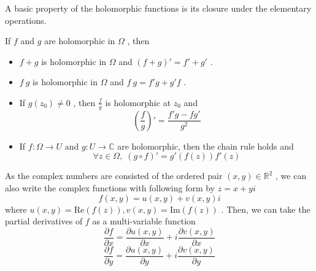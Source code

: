 \documentclass[12pt]{report}
\theoremstyle{mydefstyle}
\newcommand{\RR}{\mathbb{R}}
\newcommand{\CC}{\mathbb{C}}
\newcommand{\RE}{\mathrm{Re}}
\newcommand{\IM}{\mathrm{Im}}
\newcommand{\Par}{\partial}
\begin{document}
A basic property of the holomorphic functions is its closure under the elementary operations.

\begin{proposition}
    If $f$ and $g$ are holomorphic in $\Omega$ , then
    \begin{itemize}
        \item $f+g$ is holomorphic in $\Omega$ and $(f+g)'=f'+g'$ .
        \item $f\ g$ is holomorphic in $\Omega$ and $f\ g = f'g+g'f$ .
        \item If $g(z_0) \neq 0$ , then $\frac{f}{g}$ is holomorphic at $z_0$ and
        \[ \left(\frac{f}{g}\right)'= \frac{f'g-fg'}{g^2} \]
        \item If $f: \Omega \longrightarrow U$ and $g:U \longrightarrow \CC$ are holomorphic, then the chain rule holds and
        \[ \forall z \in \Omega, \;(g\circ f)'=g'(f(z))f'(z) \]
    \end{itemize}
\end{proposition}

As the complex numbers are consisted of the ordered pair $(x,y)\in \RR^2$ , we can also write the complex functions with following form by $z=x+yi$
\[ f(x,y) = u(x,y)+v(x,y)i \]
where $u(x,y)= \RE(f(z)), v(x,y)=\IM(f(z))$ . Then, we can take the partial derivatives of $f$ as a multi-variable function
\[ \frac{\Par f}{\Par x} = \frac{\Par u(x,y)}{\Par x} + i \frac{\Par v(x,y)}{\Par x} \]
\[ \frac{\Par f}{\Par y} = \frac{\Par u(x,y)}{\Par y} + i \frac{\Par v(x,y)}{\Par y} \]
\end{document}
